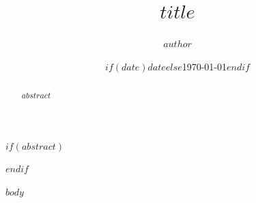 \documentclass[11pt]{article}
\title{$title$}
\author{$author$}
\date{$if(date)$$date$$else$\today$endif$}
\begin{document}
\maketitle
$if(abstract)$
\begin{abstract}
$abstract$
\end{abstract}
$endif$

$body$



\end{document}
